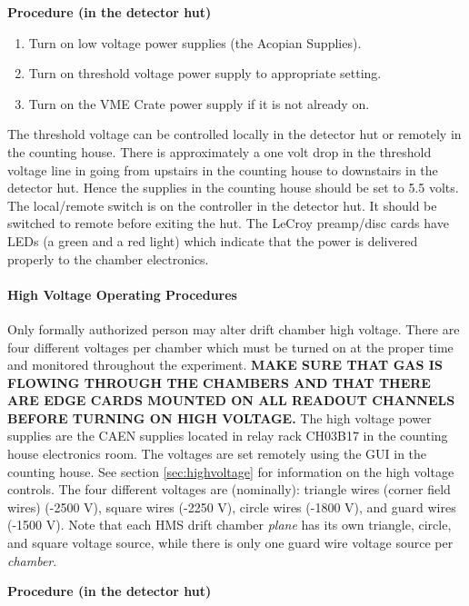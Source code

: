 {\begin{center}
{\bf Procedure (in the detector hut)}
\end{center}

\begin{enumerate}
\item {Turn on low voltage power supplies (the Acopian Supplies).}
\item {Turn on threshold voltage power supply to appropriate setting.}
\item {Turn on the VME Crate power supply if it is not already on.}
\end{enumerate}

The threshold voltage
can be controlled locally in the detector hut or remotely in the
counting house. There is approximately a one volt drop in the threshold
voltage line in going from upstairs in the counting house to
downstairs in the detector hut.  Hence the supplies in the counting
house should be set to 5.5 volts. The local/remote switch is on the
controller in the
detector hut.  It should be switched to remote before exiting the hut.  The
LeCroy preamp/disc cards have LEDs (a green and a red light) which indicate
that the power is delivered properly to the chamber electronics.

\paragraph{High Voltage Operating Procedures}

Only formally authorized person may alter drift chamber high voltage.
There are four different voltages per chamber which must be turned on at the
proper time and monitored throughout the experiment.  {\bf MAKE SURE THAT
GAS IS FLOWING THROUGH THE CHAMBERS AND THAT THERE ARE
EDGE
CARDS MOUNTED
ON ALL READOUT CHANNELS BEFORE TURNING ON HIGH VOLTAGE.}
The high voltage
power supplies are the CAEN supplies located in relay rack CH03B17 in
the counting house electronics room.  The
voltages are set remotely using the GUI in the counting
house. See section \ref{sec:highvoltage} for information on
the high voltage controls.
The four different voltages are (nominally): triangle
wires (corner field wires) (-2500 V),
square wires (-2250 V), circle wires (-1800 V), and guard wires (-1500 V).
Note that each HMS drift chamber {\em plane} has its own triangle, circle,
and square voltage source, while there is only one guard wire voltage
source per {\em chamber}.
\begin{center}
{\bf Procedure (in the detector hut)}
\end{center}

}
